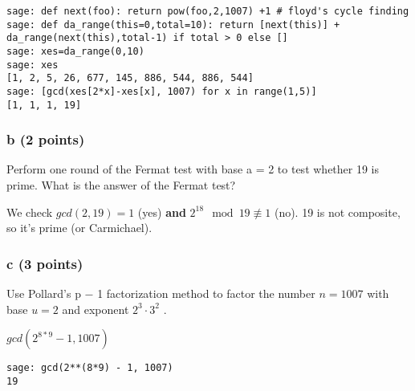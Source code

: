 \documentclass{article}
\begin{document}
\begin{verbatim}
sage: def next(foo): return pow(foo,2,1007) +1 # floyd's cycle finding
sage: def da_range(this=0,total=10): return [next(this)] + da_range(next(this),total-1) if total > 0 else []
sage: xes=da_range(0,10)
sage: xes
[1, 2, 5, 26, 677, 145, 886, 544, 886, 544]
sage: [gcd(xes[2*x]-xes[x], 1007) for x in range(1,5)]
[1, 1, 1, 19]
\end{verbatim}

\subsubsection{b (2 points)}
Perform one round of the Fermat test with base
a = 2 to test whether 19 is prime.
What is the answer of the Fermat test?

We check $gcd(2,19) = 1$ (yes) \textbf{and} $2^18 \mod 19 \not \equiv 1$ (no).
19 is not composite, so it's prime (or Carmichael).

\subsubsection{c (3 points)}
Use Pollard’s p − 1 factorization method to factor the number
$n = 1007$ with base $u = 2$ and exponent $2^3 \cdot 3^2$ .

$gcd(2^{8*9} -1, 1007)$ \\
\begin{verbatim}
sage: gcd(2**(8*9) - 1, 1007)
19
\end{verbatim}
\end{document}
